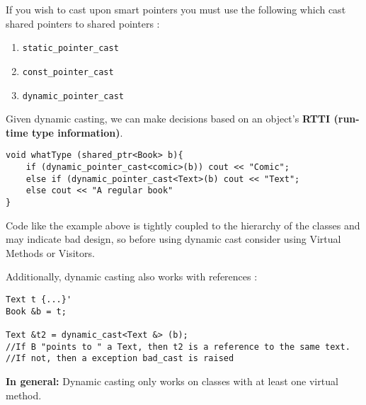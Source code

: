 \documentclass{article}
\begin{document}
If you wish to cast upon smart pointers you must use the following which cast shared pointers to shared pointers :
\begin{enumerate}
\item \verb|static_pointer_cast|
\item \verb|const_pointer_cast|
\item \verb|dynamic_pointer_cast|
\end{enumerate}

Given dynamic casting, we can make decisions based on an object's \textbf{RTTI (run-time type information)}.

\begin{lstlisting}
void whatType (shared_ptr<Book> b){
	if (dynamic_pointer_cast<comic>(b)) cout << "Comic";
	else if (dynamic_pointer_cast<Text>(b) cout << "Text";
	else cout << "A regular book" 
}
\end{lstlisting}

Code like the example above is tightly coupled to the hierarchy of the classes and may indicate bad design, so before using dynamic cast consider using Virtual Methods or Visitors. 

Additionally, dynamic casting also works with references : 

\begin{lstlisting}
Text t {...}'
Book &b = t;

Text &t2 = dynamic_cast<Text &> (b); 
//If B "points to " a Text, then t2 is a reference to the same text.
//If not, then a exception bad_cast is raised
\end{lstlisting}

\textbf{In general:} Dynamic casting only works on classes with at least one virtual method. 
\end{document}
